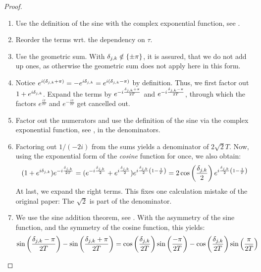 \begin{proof}
\begin{enumerate}[label=(\roman*)]
        \begin{enumerate}[label=(\arabic*), wide]
            \item \label{alpha_values_rewrite_step_1} Use the definition of the sine with the complex exponential function, see .
            \item \label{alpha_values_rewrite_step_2} Reorder the terms wrt. the dependency on \(\tau\).
            \item \label{alpha_values_rewrite_step_3} Use the geometric sum. With \(\delta_{j, k} \notin \{\pm \pi\}\), it is assured, that we do not add up ones, as otherwise the geometric sum does not apply here in this form.
            \item \label{alpha_values_rewrite_step_4} Notice \(e^{i(\delta_{j, k}+\pi)} = -e^{i\delta_{j, k}} = e^{i(\delta_{j, k}-\pi)}\) by definition. Thus, we first factor out \(1+e^{i\delta_{j, k}}\). Expand the terms by \(e^{-i\frac{\delta_{j, k}+\pi}{2T}}\) and \(e^{-i\frac{\delta_{j, k}-\pi}{2T}}\), through which the factors \(e^{\frac{i\pi}{2T}}\) and \(e^{-\frac{i\pi}{2T}}\) get cancelled out.
            \item \label{alpha_values_rewrite_step_5} Factor out the numerators and use the definition of the sine via the complex exponential function, see , in the denominators.
            \item \label{alpha_values_rewrite_step_6} Factoring out \(1/(-2i)\) from the sums yields a denominator of \(2\sqrt{2}T\). Now, using the exponential form of the \emph{cosine} function for once, we also obtain:
            \begin{align}
                (1+e^{i\delta_{j, k}})e^{-i\frac{\delta_{j, k}}{2T}} = (e^{-i\frac{\delta_{j, k}}{2}}+e^{i\frac{\delta_{j, k}}{2}})e^{i\frac{\delta_{j, k}}{2}\left(1-\frac{1}{T}\right)} = 2\cos\left(\frac{\delta_{j, k}}{2}\right)e^{i\frac{\delta_{j, k}}{2}\left(1-\frac{1}{T}\right)}
            \end{align}
            At last, we expand the right terms. This fixes one calculation mistake of the original paper: The \(\sqrt{2}\) is part of the denominator.
            \item \label{alpha_values_rewrite_step_7} We use the sine addition theorem, see . With the asymmetry of the sine function, and the symmetry of the cosine function, this yields:
            \begin{align}
                \sin\left(\frac{\djk-\pi}{2T}\right)-\sin\left(\frac{\djk+\pi}{2T}\right) &= \cos\left(\frac{\djk}{2T}\right)\sin\left(\frac{-\pi}{2T}\right)-\cos\left(\frac{\djk}{2T}\right)\sin\left(\frac{\pi}{2T}\right)\\

\end{align}
\end{enumerate}
\end{enumerate}
\end{proof}
